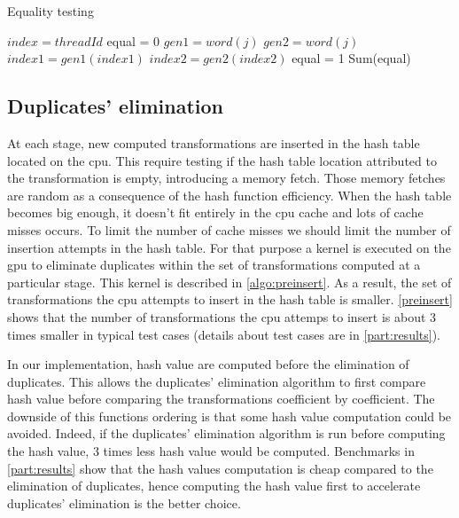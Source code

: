 {\begin{algorithm}
\caption{Equality testing}
\label{algo:equal}
\begin{algorithmic}
\STATE $index = threadId$
\STATE equal = 0
\STATE $gen1 = word(j)$
\STATE $gen2 = word(j)$
\STATE $index1 = gen1(index1)$
\STATE $index2 = gen2(index2)$
\ENDFOR
{}
\STATE equal = 1
\ENDIF
\ENDIF
\STATE Sum(equal)
\end{algorithmic}
\end{algorithm}

\subsection{Duplicates' elimination}
\label{part:preinsert}

At each stage, new computed transformations are inserted in the hash table located on the \gls{cpu}. 
This require testing if the hash table location attributed to the transformation is empty, introducing a memory fetch. 
Those memory fetches are random as a consequence of the hash function efficiency. 
When the hash table becomes big enough, it doesn't fit entirely in the \gls{cpu} cache and lots of cache misses occurs.
To limit the number of cache misses we should limit the number of insertion attempts in the hash table. 
For that purpose a kernel is executed on the \gls{gpu} to eliminate duplicates within the set of transformations computed at a particular stage. 
This kernel is described in \autoref{algo:preinsert}. 
As a result, the set of transformations the \gls{cpu} attempts to insert in the hash table is smaller. 
\autoref{preinsert} shows that the number of transformations the \gls{cpu} attemps to insert is about 3 times smaller in typical test cases 
(details about test cases are in \autoref{part:results}).

In our implementation, hash value are computed before the elimination of duplicates. 
This allows the duplicates' elimination algorithm to first compare hash value before comparing the transformations coefficient by coefficient. 
The downside of this functions ordering is that some hash value computation could be avoided. 
Indeed, if the duplicates' elimination algorithm is run before computing the hash value, 3 times less hash value would be computed. 
Benchmarks in \autoref{part:results} show that the hash values computation is cheap compared to the elimination of duplicates, 
hence computing the hash value first to accelerate duplicates' elimination is the better choice.

}
